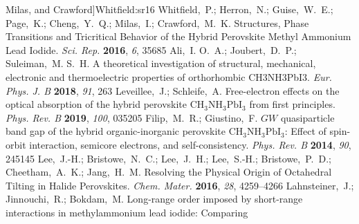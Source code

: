 \documentclass[journal=jpccck,manuscript=article,layout=twocolumn]{achemso}
\begin{document}
\begin{mcitethebibliography}{62}
  Milas, and Crawford]{Whitfield:sr16}
Whitfield,~P.; Herron,~N.; Guise,~W.~E.; Page,~K.; Cheng,~Y.~Q.; Milas,~I.;
  Crawford,~M.~K. Structures, Phase Transitions and Tricritical Behavior of the
  Hybrid Perovskite Methyl Ammonium Lead Iodide. \emph{Sci. Rep.}
  \textbf{2016}, \emph{6}, 35685\relax
\mciteBstWouldAddEndPuncttrue
\mciteSetBstMidEndSepPunct{\mcitedefaultmidpunct}
{\mcitedefaultendpunct}{\mcitedefaultseppunct}\relax
\EndOfBibitem
{}
Ali,~I. O.~A.; Joubert,~D.~P.; Suleiman,~M. S.~H. A theoretical investigation
  of structural, mechanical, electronic and thermoelectric properties of
  orthorhombic CH3NH3PbI3. \emph{Eur. Phys. J. B} \textbf{2018}, \emph{91},
  263\relax
\mciteBstWouldAddEndPuncttrue
\mciteSetBstMidEndSepPunct{\mcitedefaultmidpunct}
{\mcitedefaultendpunct}{\mcitedefaultseppunct}\relax
\EndOfBibitem
{}
Leveillee,~J.; Schleife,~A. Free-electron effects on the optical absorption of
  the hybrid perovskite ${\mathrm{CH}}_{3}{\mathrm{NH}}_{3}{\mathrm{PbI}}_{3}$
  from first principles. \emph{Phys. Rev. B} \textbf{2019}, \emph{100},
  035205\relax
\mciteBstWouldAddEndPuncttrue
\mciteSetBstMidEndSepPunct{\mcitedefaultmidpunct}
{\mcitedefaultendpunct}{\mcitedefaultseppunct}\relax
\EndOfBibitem
{}
Filip,~M.~R.; Giustino,~F. $GW$ quasiparticle band gap of the hybrid
  organic-inorganic perovskite
  ${\mathrm{CH}}_{3}{\mathrm{NH}}_{3}{\mathrm{PbI}}_{3}$: Effect of spin-orbit
  interaction, semicore electrons, and self-consistency. \emph{Phys. Rev. B}
  \textbf{2014}, \emph{90}, 245145\relax
\mciteBstWouldAddEndPuncttrue
\mciteSetBstMidEndSepPunct{\mcitedefaultmidpunct}
{\mcitedefaultendpunct}{\mcitedefaultseppunct}\relax
\EndOfBibitem
{}
Lee,~J.-H.; Bristowe,~N.~C.; Lee,~J.~H.; Lee,~S.-H.; Bristowe,~P.~D.;
  Cheetham,~A.~K.; Jang,~H.~M. Resolving the Physical Origin of Octahedral
  Tilting in Halide Perovskites. \emph{Chem. Mater.} \textbf{2016}, \emph{28},
  4259--4266\relax
\mciteBstWouldAddEndPuncttrue
\mciteSetBstMidEndSepPunct{\mcitedefaultmidpunct}
{\mcitedefaultendpunct}{\mcitedefaultseppunct}\relax
\EndOfBibitem
{}
Lahnsteiner,~J.; Jinnouchi,~R.; Bokdam,~M. Long-range order imposed by
  short-range interactions in methylammonium lead iodide: Comparing

\end{mcitethebibliography}
\end{document}
